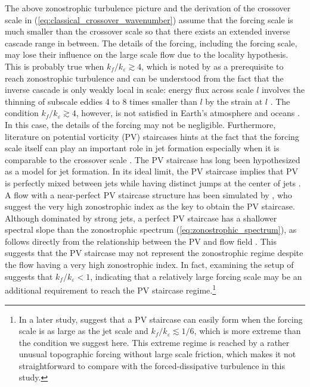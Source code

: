 \documentclass{jfm}
\begin{document}
The above zonostrophic turbulence picture and the derivation of
the crossover scale in (\ref{eq:classical_crossover_wavenumber}) assume
that the forcing scale is much smaller than the crossover scale so that
there exists an extended inverse cascade range in between.
The details of the forcing, including the forcing scale,
may lose their influence on the large scale flow due to
the locality hypothesis. This is probably true when $k_{f}/k_{\varepsilon}\apprge4$,
which is noted by \citet{Sukoriansky2007} as a prerequisite
to reach zonostrophic turbulence and can be understood from the fact
that the inverse cascade is only weakly local in scale: 
energy flux across scale $l$ involves
the thinning of subscale eddies 4 to 8 times smaller than $l$ by
the strain at $l$ \citep{Chen2006}.
The condition $k_{f}/k_{\varepsilon}\apprge4$, however, 
is not satisfied in Earth's atmosphere \citep{Schneider2006,Merlis2009}
and oceans \citep{Tulloch2011}. In this case, the details of the
forcing may not be negligible. Furthermore, literature 
on potential vorticity (PV) staircases hints at the fact that
the forcing scale itself can play an important role 
in jet formation especially when it is comparable to the crossover scale \citep{Scott2012}.
The PV staircase has long been hypothesized as a model for jet formation.
In its ideal limit, the PV staircase implies that PV is
perfectly mixed between jets while having distinct jumps at the center
of jets \citep{Marcus1993,Marcus1998,Dunkerton2008,Dritschel2008}.
A flow with a near-perfect PV staircase structure has been 
simulated by \citet{Scott2012}, who suggest the very high
zonostrophic index as the key to obtain the PV staircase. 
Although dominated by strong jets,
a perfect PV staircase has a shallower spectral slope than the zonostrophic spectrum
(\ref{eq:zonostrophic_spectrum}), as follows directly from the
relationship between the PV and flow field \citep{Saffman1971,Danilov2004}.
This suggests that the PV staircase may not represent the zonostrophic
regime despite the flow having a very high zonostrophic index. In fact,
examining the setup of \citet{Scott2012} suggests that 
$k_{f}/k_{\varepsilon}<1$, indicating that a relatively large forcing
scale may be an additional requirement to reach the PV staircase regime.\footnote{
In a later study, \citet{Scott2012a} suggest that a PV staircase can
easily form when the forcing scale is as large as the jet scale and
$k_{f}/k_{\varepsilon}\apprle1/6$, which is more extreme than the
condition we suggest here. This extreme regime is reached by a rather
unusual topographic forcing without large scale friction, which makes
it not straightforward to compare with the forced-dissipative turbulence
in this study.} 
\end{document}

